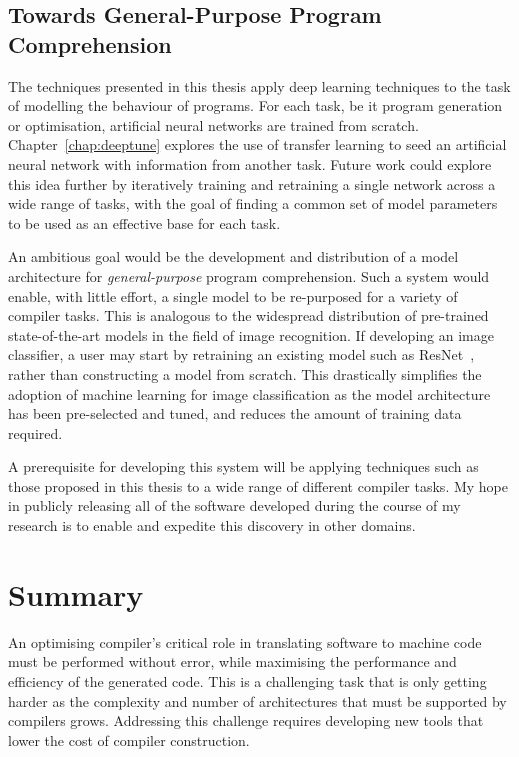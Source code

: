 \subsection{Towards General-Purpose Program Comprehension}

The techniques presented in this thesis apply deep learning techniques to the task of modelling the behaviour of programs. For each task, be it program generation or optimisation, artificial neural networks are trained from scratch. Chapter~\ref{chap:deeptune} explores the use of transfer learning to seed an artificial neural network with information from another task. Future work could explore this idea further by iteratively training and retraining a single network across a wide range of tasks, with the goal of finding a common set of model parameters to be used as an effective base for each task.

An ambitious goal would be the development and distribution of a model architecture for \emph{general-purpose} program comprehension. Such a system would enable, with little effort, a single model to be re-purposed for a variety of compiler tasks. This is analogous to the widespread distribution of pre-trained state-of-the-art models in the field of image recognition. If developing an image classifier, a user may start by retraining an existing model such as ResNet~\cite{He2016}, rather than constructing a model from scratch. This drastically simplifies the adoption of machine learning for image classification as the model architecture has been pre-selected and tuned, and reduces the amount of training data required.

A prerequisite for developing this system will be applying techniques such as those proposed in this thesis to a wide range of different compiler tasks. My hope in publicly releasing all of the software developed during the course of my research is to enable and expedite this discovery in other domains.


\section{Summary}
\label{sec:conclusions-summary}

An optimising compiler's critical role in translating software to machine code must be performed without error, while maximising the performance and efficiency of the generated code. This is a challenging task that is only getting harder as the complexity and number of architectures that must be supported by compilers grows. Addressing this challenge requires developing new tools that lower the cost of compiler construction.


